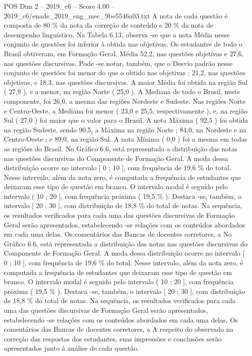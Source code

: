 \begin{textsample}{POS Dim 2 – 2019\_c6 – Score 4.00 – 2019\_c6/enade\_2019\_eng\_mec\_9be5546a03.txt}
A nota de cada questão é composta de 80 \% da nota da correção de conteúdo e 20 \% da nota de desempenho linguístico.
Na Tabela 6.13, observa -se que a nota Média nesse conjunto de questões foi inferior à obtida nas objetivas.
Os estudantes de todo o Brasil obtiveram, em Formação Geral, Média 52,2, nas questões objetivas e 27,6, nas questões discursivas.
Pode -se notar, também, que o Desvio padrão nesse conjunto de questões foi menor do que o obtido nas objetivas : 21,2, nas questões objetivas, e 18,3, nas questões discursivas.
A maior Média foi obtida na região Sul ( 27,9 ), e a menor, na região Norte ( 25,0 ).
A Mediana de todo o Brasil, neste componente, foi 26,0, a mesma das regiões Nordeste e Sudeste.
Nas regiões Norte e Centro-Oeste, a Mediana foi menor ( 23,0 e 25,5, respectivamente ), e, na região Sul ( 27,0 ) foi maior que o valor para o Brasil.
A nota Máxima ( 92,5 ) foi obtida na região Sudeste, sendo 90,5, a Máxima na região Norte ; 84,0, na Nordeste e na Centro-Oeste ; e 89,0, na região Sul.
A nota Mínima ( 0,0 ) foi a mesma em todas as regiões do Brasil.
No Gráfico 6.6, está representada a distribuição das notas nas questões discursivas do Componente de Formação Geral.
A moda dessa distribuição ocorre no intervalo [ 0 ; 10 ], com frequência de 19,6 \% do total.
Nesse intervalo, além da nota zero, é computada a frequência de estudantes que deixaram esse tipo de questão em branco.
O intervalo modal é seguido pelo intervalo ( 10 ; 20 ], com frequência próxima ( 19,5 \% ).
Destaca -se, também, o intervalo [ 20 ; 30 ], com distribuição de 18,8 \% do total de notas.
Na sequência, os resultados verificados para cada uma das questões discursivas de Formação Geral serão apresentados, estabelecendo -se relações com os conteúdos abordados em cada uma delas.
Os comentários das Bancas de docentes corretores, a No Gráfico 6.6, está representada a distribuição das notas nas questões discursivas do Componente de Formação Geral.
A moda dessa distribuição ocorre no intervalo [ 0 ; 10 ], com frequência de 19,6 \% do total.
Nesse intervalo, além da nota zero, é computada a frequência de estudantes que deixaram esse tipo de questão em branco.
O intervalo modal é seguido pelo intervalo ( 10 ; 20 ], com frequência próxima ( 19,5 \% ).
Destaca -se, também, o intervalo [ 20 ; 30 ], com distribuição de 18,8 \% do total de notas.
Na sequência, os resultados verificados para cada uma das questões discursivas de Formação Geral serão apresentados, estabelecendo -se relações com os conteúdos abordados em cada uma delas.
Os comentários das Bancas de docentes corretores, a A respeito do observado na correção das respostas dos estudantes, suas impressões e conclusões serão apresentados junto à análise de cada questão.

\end{textsample}
